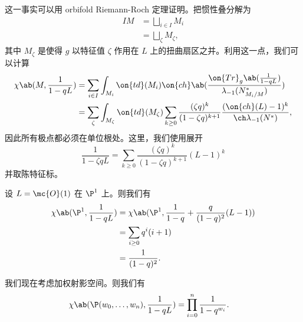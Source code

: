 这一事实可以用 orbifold Riemann-Roch 定理证明。把惯性叠分解为
\begin{align*}
    IM &= \bigsqcup_{i \in I} M_i \\
    &= \bigsqcup_{\zeta} M_{\zeta},
\end{align*}
其中 \(M_{\zeta}\) 是使得 \(g\) 以特征值 \(\zeta\) 作用在 \(L\) 上的扭曲扇区之并。利用这一点，我们可以计算
\begin{align*}
    \chi\ab(M, \frac{1}{1-qL}) &= \sum_{i \in I} \int_{M_i} \on{td}(M_i) \on{ch} \ab(\frac{ \on{Tr}_g \ab(\frac{1}{1-qL}) }{\lambda_{-1}(N_{M_i/M}^*)}) \\
    &= \sum_{\zeta} \int_{M_{\zeta}} \on{td}(M_{\zeta}) \sum_{k \geq 0} \frac{(\zeta q)^k}{(1-\zeta q)^{k+1}} \frac{( \on{ch}(L)-1 )^k}{\ch \lambda_{-1}(N^*)},
\end{align*}
因此所有极点都必须在单位根处。这里，我们使用展开
\[ \frac{1}{1-\zeta q L} = \sum_{k \geq 0} \frac{(\zeta q)^k}{(1-\zeta q)^{k+1}} (L-1)^k \]
并取陈特征标。

\begin{exm}
    设 \(L = \mc{O}(1)\) 在 \(\P^1\) 上。则我们有
    \begin{align*}
        \chi\ab(\P^1, \frac{1}{1-qL}) &= \chi\ab(\P^1, \frac{1}{1-q} + \frac{q}{(1-q)^2}(L-1)) \\
        &= \sum_{i \geq 0} q^i (i+1) \\
        &= \frac{1}{(1-q)^2}.
    \end{align*}
\end{exm}

\begin{exm}
    我们现在考虑加权射影空间。则我们有
    \begin{align*}
        \chi\ab(\P(w_0, \ldots, w_n), \frac{1}{1-qL}) &= \prod_{i=0}^n \frac{1}{1-q^{w_i}}. 
    \end{align*}
\end{exm}

